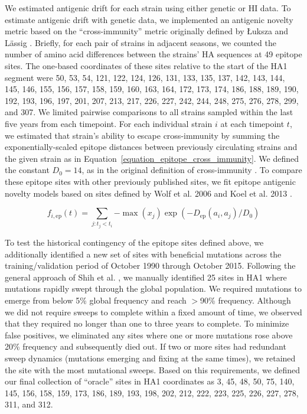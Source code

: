 We estimated antigenic drift for each strain using either genetic or HI data.
To estimate antigenic drift with genetic data, we implemented an antigenic novelty metric based on the ``cross-immunity'' metric originally defined by {\L}uksza and L\"assig \cite{Luksza:2014hj}.
Briefly, for each pair of strains in adjacent seasons, we counted the number of amino acid differences between the strains' HA sequences at 49 epitope sites.
The one-based coordinates of these sites relative to the start of the HA1 segment were 50, 53, 54, 121, 122, 124, 126, 131, 133, 135, 137, 142, 143, 144, 145, 146, 155, 156, 157, 158, 159, 160, 163, 164, 172, 173, 174, 186, 188, 189, 190, 192, 193, 196, 197, 201, 207, 213, 217, 226, 227, 242, 244, 248, 275, 276, 278, 299, and 307.
We limited pairwise comparisons to all strains sampled within the last five years from each timepoint.
For each individual strain $i$ at each timepoint $t$, we estimated that strain's ability to escape cross-immunity by summing the exponentially-scaled epitope distances between previously circulating strains and the given strain as in Equation~\ref{equation_epitope_cross_immunity}.
We defined the constant $D_{0} = 14$, as in the original definition of cross-immunity \cite{Luksza:2014hj}.
To compare these epitope sites with other previously published sites, we fit epitope antigenic novelty models based on sites defined by Wolf et al. 2006 \cite{Wolf:2006da} and Koel et al. 2013 \cite{Koel:2013jz}.

\begin{equation}
    f_{i,\mathrm{ep}}(t) = \sum_{j: t_{j} < t_{i}}{-\max(x_{j})\exp{(-D_{\mathrm{ep}}(a_{i}, a_{j}) / D_{0})}}
    \label{equation_epitope_cross_immunity}
\end{equation}

To test the historical contingency of the epitope sites defined above, we additionally identified a new set of sites with beneficial mutations across the training/validation period of October 1990 through October 2015.
Following the general approach of Shih et al. \cite{Shih:2007bd}, we manually identified 25 sites in HA1 where mutations rapidly swept through the global population.
We required mutations to emerge from below 5\% global frequency and reach $>$90\% frequency.
Although we did not require sweeps to complete within a fixed amount of time, we observed that they required no longer than one to three years to complete.
To minimize false positives, we eliminated any sites where one or more mutations rose above 20\% frequency and subsequently died out.
If two or more sites had redundant sweep dynamics (mutations emerging and fixing at the same times), we retained the site with the most mutational sweeps.
Based on this requirements, we defined our final collection of ``oracle'' sites in HA1 coordinates as 3, 45, 48, 50, 75, 140, 145, 156, 158, 159, 173, 186, 189, 193, 198, 202, 212, 222, 223, 225, 226, 227, 278, 311, and 312.

